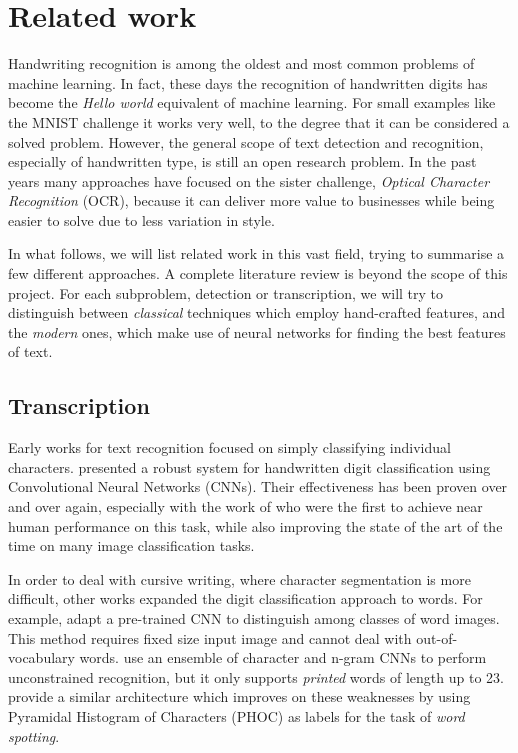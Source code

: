 

\section{Related work}\label{sec:related_work}
	Handwriting recognition is among the oldest and most common problems of machine learning. In fact, these days the recognition of handwritten digits has become the \textit{Hello world} equivalent of machine learning. For small examples like the MNIST challenge it works very well, to the degree that it can be considered a solved problem. However, the general scope of text detection and recognition, especially of handwritten type, is still an open research problem. In the past years many approaches have focused on the sister challenge, \emph{Optical Character Recognition} (OCR), because it can deliver more value to businesses while being easier to solve due to less variation in style.

	In what follows, we will list related work in this vast field, trying to summarise a few different approaches. A complete literature review is beyond the scope of this project. For each subproblem, detection or transcription, we will try to distinguish between \emph{classical} techniques which employ hand-crafted features, and the \emph{modern} ones, which make use of neural networks for finding the best features of text.


	\subsection{Transcription}\label{sec:related_transcription}
		Early works for text recognition focused on simply classifying individual characters.  presented a robust system for handwritten digit classification using Convolutional Neural Networks (CNNs). Their effectiveness has been proven over and over again, especially with the work of \citet{ciresan} who were the first to achieve near human performance on this task, while also improving the state of the art of the time on many image classification tasks.

		In order to deal with cursive writing, where character segmentation is more difficult, other works expanded the digit classification approach to words. For example, \citet{sharma2015adapting} adapt a pre-trained CNN to distinguish among classes of word images. This method requires fixed size input image and cannot deal with out-of-vocabulary words.  use an ensemble of character and n-gram CNNs to perform unconstrained recognition, but it only supports \emph{printed} words of length up to 23.  provide a similar architecture which improves on these weaknesses by using Pyramidal Histogram of Characters (PHOC) as labels for the task of \emph{word spotting}.

